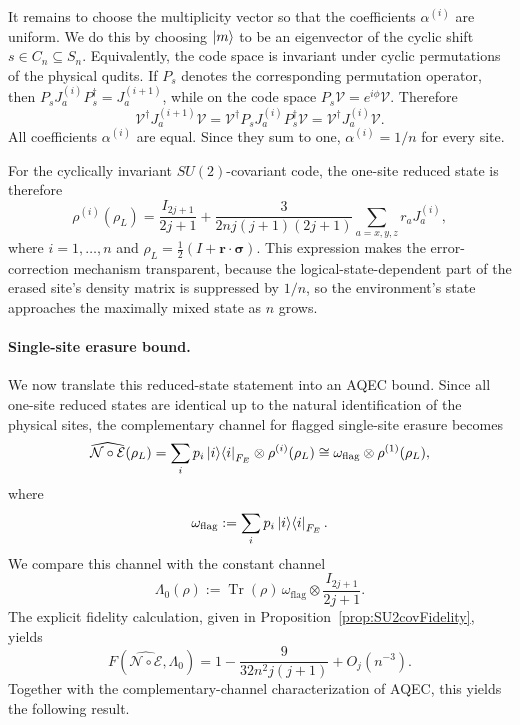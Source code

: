 \documentclass[10pt,twocolumn,superscriptaddress,aps,amsmath,amssymb,citeautoscript,floatfix,prx]{revtex4-2}
\theoremstyle{plain}
\theoremstyle{plain}
\theoremstyle{plain}
\theoremstyle{plain}
\theoremstyle{plain}
\theoremstyle{plain}
\theoremstyle{plain}
\theoremstyle{definition}
\theoremstyle{plain}
\begin{document}
It remains to choose the multiplicity vector so that the coefficients $\alpha^{(i)}$ are uniform. 
We do this by choosing $\ket m$ to be an eigenvector of the cyclic shift $s\in C_n\subseteq S_n$. 
Equivalently, the code space is invariant under cyclic permutations of the physical qudits. If $P_s$ denotes the corresponding permutation operator, 
then $P_s J_a^{(i)}P_s^\dagger=J_a^{(i+1)}$, while on the code space $P_s\mathcal{V}=e^{i\phi}\mathcal{V}$. Therefore
\[
    \mathcal{V}^\dagger J_a^{(i+1)}\mathcal{V}
    =
    \mathcal{V}^\dagger P_sJ_a^{(i)}P_s^\dagger \mathcal{V}
    =
    \mathcal{V}^\dagger J_a^{(i)}\mathcal{V} .
\]
All coefficients $\alpha^{(i)}$ are equal. Since they sum to one, $\alpha^{(i)}=1/n$ for every site.

For the cyclically invariant $SU(2)$-covariant code, the one-site reduced state is therefore
\begin{equation}\label{eq:reduced_state_su2}
    \rho^{(i)}(\rho_L)
    =
    \frac{I_{2j+1}}{2j+1}
    +
    \frac{3}{2nj(j+1)(2j+1)}
    \sum_{a=x,y,z} r_a J_a^{(i)},
\end{equation}
where $i=1,\ldots,n$ and $\rho_L=\frac12(I+\mathbf r\cdot\boldsymbol\sigma)$. This expression makes the error-correction mechanism transparent, 
because the logical-state-dependent part of the erased site's density matrix is suppressed by $1/n$, so the environment's state approaches the maximally mixed state as $n$ grows.

\paragraph{Single-site erasure bound.}
We now translate this reduced-state statement into an AQEC bound. Since all one-site reduced states are identical up to the natural identification 
of the physical sites, the complementary channel for flagged single-site erasure becomes
\begin{equation}\label{eq:comp_chan_su2}
    \widehat{\mathcal N\circ\mathcal E}(\rho_L)
    =
    \sum_i p_i\ket i\!\bra i_{F_E}\otimes \rho^{(i)}(\rho_L)
    \cong
    \omega_{\mathrm{flag}}\otimes \rho^{(1)}(\rho_L),
\end{equation}
where
\[
    \omega_{\mathrm{flag}}
    :=
    \sum_i p_i\ket i\!\bra i_{F_E} .
\]
We compare this channel with the constant channel
\[
    \Lambda_0(\rho)
    :=
    \operatorname{Tr}(\rho)\,
    \omega_{\mathrm{flag}}\otimes \frac{I_{2j+1}}{2j+1} .
\]
The explicit fidelity calculation, given in Proposition~\ref{prop:SU2covFidelity}, yields
\begin{equation}\label{eq:fidelity_su2}
    F\!\left(\widehat{\mathcal N\circ\mathcal E},\Lambda_0\right)
    =
    1-
    \frac{9}{32n^2j(j+1)}
    +O_{j}(n^{-3}) .
\end{equation}
Together with the complementary-channel characterization of AQEC, this yields the following result.
\end{document}
